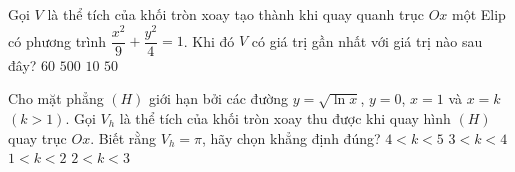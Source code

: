 \begin{ex}%
	Gọi $V$ là thể tích của khối tròn xoay tạo thành khi quay quanh trục $Ox$ một Elip có phương trình $\dfrac{x^2}{9}+\dfrac{y^2}{4}=1$. Khi đó $V$ có giá trị gần nhất với giá trị nào sau đây?
	\choice
	{$60$}
	{$500$}
	{$10$}
	{\True $50$}
\end{ex}
\begin{ex}%
	Cho mặt phẳng $(H)$ giới hạn bởi các đường $y=\sqrt{\ln x}$, $y=0$, $x=1$ và $x=k$ $(k>1)$. Gọi $V_h$ là thể tích của khối tròn xoay thu được khi quay hình $(H)$ quay trục $Ox$. Biết rằng $V_h=\pi$, hãy chọn khẳng định đúng?
	\choice
	{$4<k<5$}
	{$3<k<4$}
	{$1<k<2$}
	{\True $2<k<3$}
\end{ex}
